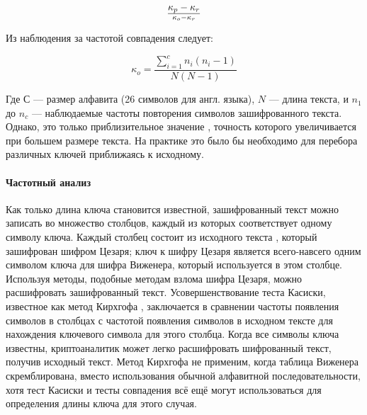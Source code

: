     $${\kappa_p-\kappa_r}\over{\kappa_o-\kappa_r}$$

Из наблюдения за частотой совпадения следует:

    $$\kappa_o=\frac{\sum_{i=1}^{c}n_i(n_i -1)}{N(N-1)}$$

Где $С$ — размер алфавита (26 символов для англ. языка), $N$ — длина 
текста, и $n_1$ до $n_c$ — наблюдаемые частоты повторения символов 
зашифрованного текста. Однако, это только приблизительное значение
, точность которого увеличивается при большем размере текста. 
На практике это было бы необходимо для перебора различных ключей 
приближаясь к исходному.

\paragraph{Частотный анализ}

Как только длина ключа становится известной, зашифрованный текст 
можно записать во множество столбцов, каждый из которых соответствует 
одному символу ключа. Каждый столбец состоит из исходного текста
, который зашифрован шифром Цезаря; ключ к шифру Цезаря является 
всего-навсего одним символом ключа для шифра Виженера, который 
используется в этом столбце. Используя методы, подобные методам 
взлома шифра Цезаря, можно расшифровать зашифрованный текст. 
Усовершенствование теста Касиски, известное как метод Кирхгофа
, заключается в сравнении частоты появления символов в столбцах 
с частотой появления символов в исходном тексте для нахождения 
ключевого символа для этого столбца. Когда все символы ключа 
известны, криптоаналитик может легко расшифровать шифрованный 
текст, получив исходный текст. Метод Кирхгофа не применим, когда 
таблица Виженера скремблирована, вместо использования обычной 
алфавитной последовательности, хотя тест Касиски и тесты совпадения 
всё ещё могут использоваться для определения длины ключа для 
этого случая.
